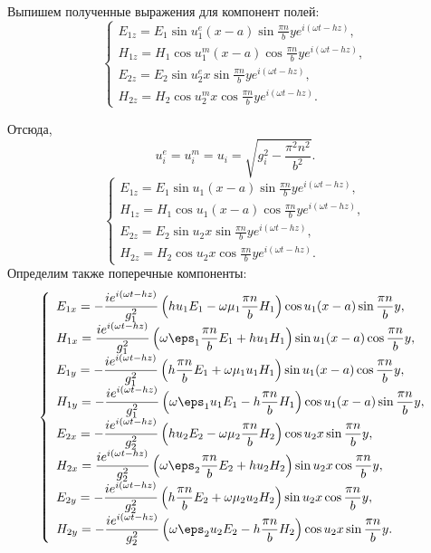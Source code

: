 Выпишем полученные выражения для компонент полей:
\[
    \left\{
    \begin{array}{l}
        E_{1z} = E_1\sin u^e_1 (x-a) \sin \frac{\pi n}{b}y
        e^{i(\omega t - h z)},\\
        H_{1z} = H_1\cos u^m_1 (x-a) \cos \frac{\pi n}{b}y
        e^{i(\omega t - h z)},\\
        E_{2z} = E_2\sin u^e_2 x \sin \frac{\pi n}{b}y
        e^{i(\omega t - h z)},\\
        H_{2z} = H_2\cos u^m_2 x \cos \frac{\pi n}{b}y
        e^{i(\omega t - h z)}.
    \end{array}
    \right.
\]

Отсюда,
\[
    u^e_i = u^m_i = u_i = \sqrt{g_i^2 - \frac{\pi^2n^2}{b^2}}.
\]
\[
    \left\{
    \begin{array}{l}
        E_{1z} = E_1\sin u_1 (x-a) \sin \frac{\pi n}{b}y
        e^{i(\omega t - h z)},\\
        H_{1z} = H_1\cos u_1 (x-a) \cos \frac{\pi n}{b}y
        e^{i(\omega t - h z)},\\
        E_{2z} = E_2\sin u_2 x \sin \frac{\pi n}{b}y
        e^{i(\omega t - h z)},\\
        H_{2z} = H_2\cos u_2 x \cos \frac{\pi n}{b}y
        e^{i(\omega t - h z)}.
    \end{array}
    \right.
\]
Определим также поперечные компоненты:
\[
    \left\{
    \begin{array}{l}
        E_{1x} = -\frac{i e^{i(\omega t - h z)}}{g_1^2}
        \left(h u_1 E_1 - \omega\mu_1\frac{\pi n}{b}H_1\right)
        \cos u_1 (x-a) \sin \frac{\pi n}{b}y,\\
        H_{1x} = \frac{i e^{i(\omega t - h z)}}{g_1^2}
        \left(\omega\eps_1\frac{\pi n}{b}E_1+h u_1 H_1\right)
        \sin u_1 (x-a) \cos \frac{\pi n}{b}y,\\
        E_{1y} = -\frac{i e^{i(\omega t - h z)}}{g_1^2}
        \left(h \frac{\pi n}{b} E_1 + \omega\mu_1u_1H_1\right)
        \sin u_1 (x-a) \cos \frac{\pi n}{b}y,\\
        H_{1y} = -\frac{i e^{i(\omega t - h z)}}{g_1^2}
        \left(\omega\eps_1u_1E_1-h \frac{\pi n}{b} H_1\right)
        \cos u_1 (x-a) \sin \frac{\pi n}{b}y,\\
        E_{2x} = -\frac{i e^{i(\omega t - h z)}}{g_2^2}
        \left(h u_2 E_2 - \omega\mu_2\frac{\pi n}{b}H_2\right)
        \cos u_2 x \sin \frac{\pi n}{b}y,\\
        H_{2x} = \frac{i e^{i(\omega t - h z)}}{g_2^2}
        \left(\omega\eps_2\frac{\pi n}{b}E_2+h u_2 H_2\right)
        \sin u_2 x \cos \frac{\pi n}{b}y,\\
        E_{2y} = -\frac{i e^{i(\omega t - h z)}}{g_2^2}
        \left(h \frac{\pi n}{b} E_2 + \omega\mu_2u_2H_2\right)
        \sin u_2 x \cos \frac{\pi n}{b}y,\\
        H_{2y} = -\frac{i e^{i(\omega t - h z)}}{g_2^2}
        \left(\omega\eps_2u_2E_2-h \frac{\pi n}{b} H_2\right)
        \cos u_2 x \sin \frac{\pi n}{b}y.
    \end{array}
    \right.
\]

